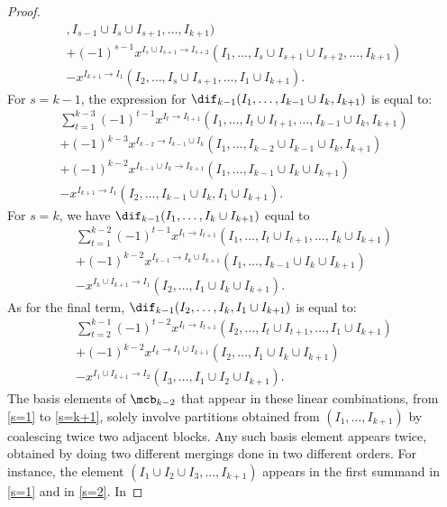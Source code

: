 \begin{proof}
\begin{multline}
  ,I_{s-1}\cup I_{s}\cup I_{s+1},\ldots, I_{k+1})
  \\+(-1)^{s-1}x^{I_{s}\cup I_{s+1}\to I_{s+2}}(I_1,\ldots
  ,I_{s}\cup I_{s+1}\cup I_{s+2},\ldots, I_{k+1}) \\
  -x^{I_{k+1}\to I_{1}}(I_2,\ldots ,I_s\cup I_{s+1},\ldots ,I_1\cup
  I_{k+1}).
\end{multline}
For $s=k-1$, the expression for $\dif_{k-1}(I_1,\ldots ,I_{k-1}\cup
I_k,I_{k+1})$ is equal to:
\begin{multline}\label{s=k-1}
\sum_{t=1}^{k-3}(-1)^{t-1}x^{I_t\to I_{t+1}}(I_1,\ldots ,I_t\cup
  I_{t+1},\ldots , I_{k-1}\cup I_k,I_{k+1}) \\+
  (-1)^{k-3}x^{I_{k-2}\to I_{k-1}\cup I_k}(I_1,\ldots ,I_{k-2}\cup
  I_{k-1}\cup I_k,I_{k+1}) \\+
(-1)^{k-2}x^{I_{k-1}\cup I_{k}\to I_{k+1}}(I_1,\ldots , I_{k-1}\cup I_k\cup I_{k+1})  \\
 -x^{I_{k+1}\to I_{1}}(I_2,\ldots ,I_{k-1}\cup I_{k}, I_1\cup
  I_{k+1}).
\end{multline}
For $s=k$, we have $\dif_{k-1}(I_1,\ldots ,I_k\cup I_{k+1})$ equal to
\begin{multline}\label{s=k}
 \sum_{t=1}^{k-2}(-1)^{t-1}x^{I_t\to I_{t+1}}(I_1,\ldots ,I_t\cup
  I_{t+1},\ldots , I_k\cup I_{k+1}) \\ + (-1)^{k-2}x^{I_{k-1}\to
    I_{k}\cup I_{k+1}}(I_1,\ldots ,I_{k-1}\cup I_{k}\cup I_{k+1})
 \\- x^{I_{k}\cup I_{k+1}\to I_{1}}(I_2,\ldots ,I_1\cup
  I_k\cup I_{k+1}).
\end{multline}
As for the final term, $\dif_{k-1}(I_2,\ldots,I_{k},I_1\cup
I_{k+1})$ is equal to:
\begin{multline}\label{s=k+1}
\sum_{t=2}^{k-1}(-1)^{t-2}x^{I_t\to I_{t+1}}(I_2,\ldots ,I_t\cup
I_{t+1},\ldots ,I_1\cup I_{k+1})\\ 
+(-1)^{k-2}x^{I_{k}\to I_{1}\cup I_{k+1}}(I_2,\ldots ,I_{1}\cup 
I_{k}\cup I_{k+1})\\
- x^{I_{1}\cup
I_{k+1}\to I_{2}}(I_3,\ldots ,I_1\cup I_2\cup I_{k+1}).
\end{multline}
The basis elements of $\mcb_{k-2}$ that appear in these linear
combinations, from \eqref{s=1} to \eqref{s=k+1}, solely involve
partitions obtained from $(I_1,\ldots,I_{k+1})$ by coalescing twice
two adjacent blocks. Any such basis element appears twice, obtained by
doing two different mergings done in two different orders. For
instance, the element $(I_1\cup I_2\cup I_3,\ldots ,I_{k+1})$ appears
in the first summand in \eqref{s=1} and in \eqref{s=2}. In

\end{proof}
